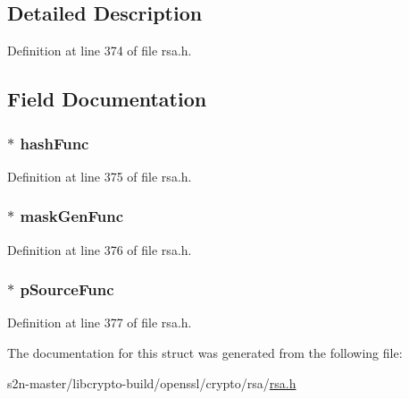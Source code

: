 \subsection{Detailed Description}


Definition at line 374 of file rsa.\+h.



\subsection{Field Documentation}
\subsubsection[{\texorpdfstring{hash\+Func}{hashFunc}}]{ $\ast$ hash\+Func}\hypertarget{structrsa__oaep__params__st_a1d5ffe64f97e9afa3614ee02a7f8ad0d}{}\label{structrsa__oaep__params__st_a1d5ffe64f97e9afa3614ee02a7f8ad0d}


Definition at line 375 of file rsa.\+h.

\subsubsection[{\texorpdfstring{mask\+Gen\+Func}{maskGenFunc}}]{ $\ast$ mask\+Gen\+Func}\hypertarget{structrsa__oaep__params__st_a55fde057dfe03c786944ac4f224138d1}{}\label{structrsa__oaep__params__st_a55fde057dfe03c786944ac4f224138d1}


Definition at line 376 of file rsa.\+h.

\subsubsection[{\texorpdfstring{p\+Source\+Func}{pSourceFunc}}]{ $\ast$ p\+Source\+Func}\hypertarget{structrsa__oaep__params__st_ad1e67fbea62b4092c06271ea0dc989ad}{}\label{structrsa__oaep__params__st_ad1e67fbea62b4092c06271ea0dc989ad}


Definition at line 377 of file rsa.\+h.



The documentation for this struct was generated from the following file\+:\begin{DoxyCompactItemize}
\item 
s2n-\/master/libcrypto-\/build/openssl/crypto/rsa/\hyperlink{crypto_2rsa_2rsa_8h}{rsa.\+h}\end{DoxyCompactItemize}
